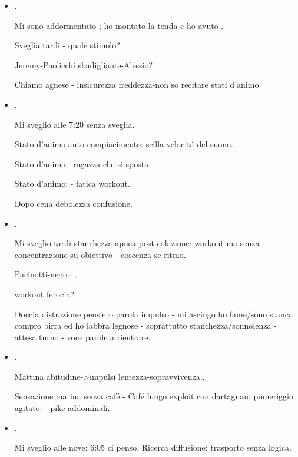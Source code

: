 \begin{itemize}
\item {}.

Mi sono addormentato ; ho montato la tenda e ho avuto .

Sveglia tardi - quale stimolo?

Jeremy-Paolicchi sbadigliante-Alessio?

Chiamo agnese - insicurezza freddezza-non so recitare stati d'animo

\item {}.

Mi sveglio alle 7:20 senza sveglia.

Stato d'animo-auto compiacimento: scilla velocit\'a del suono.

Stato d'animo: -ragazza che si sposta.

Stato d'animo:  - fatica workout.

Dopo cena debolezza confusione.

\item {}.

Mi sveglio tardi stanchezza-apnea post colazione: workout ma senza concentrazione su obiettivo - coscenza se-ritmo.

Pacinotti-negro: .

workout ferocia?

Doccia distrazione pensiero parola impulso - mi asciugo ho fame/sono stanco compro birra ed ho labbra legnose - soprattutto stanchezza/sonnolenza - attesa turno - voce parole a rientrare.

\item {}.

Mattina abitudine->impulsi lentezza-sopravvivenza..

Sensazione matina senza caf\'e - Caf\'e lungo exploit con dartagnan: pomeriggio agitato:  -  pike-addominali.

\item {}.

Mi sveglio alle nove: 6:05 ci penso. Ricerca diffusione: trasporto senza logica.


\end{itemize}
